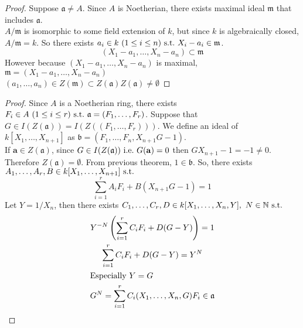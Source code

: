 \documentclass[leqno]{ltjsarticle}
\begin{document}
\begin{proof}
	Suppose $\mathfrak a\neq A$. Since $A$ is Noetherian, there exists maximal ideal $\mathfrak m$ that includes $\mathfrak a$.\\
	$A/\mathfrak m$ is isomorphic to some field extension of $k$, but since $k$ is algebraically closed, $A/\mathfrak m = k$. So there exists $a_i\in k\  (1\le i \le n) \ \mathrm{s.t.}\  X_i - a_i \in \mathfrak m$.\\
	\[(X_1-a_1,\ldots,X_n-a_n)\subset\mathfrak m\]
However because $(X_1-a_1,\ldots,X_n-a_n)$ is maximal, $\mathfrak m = (X_1-a_1,\ldots,X_n-a_n)$\\
$(a_1,\ldots ,a_n)\in Z(\mathfrak m)\subset Z(\mathfrak a)$\therefore $Z(\mathfrak a)\neq \emptyset$
\end{proof}
\begin{proof}
Since $A$ is a Noetherian ring, there exists $F_i\in A\ (1\le i\le r)\st \mathfrak a = (F_1,\ldots, F_r)$. Suppose that $G\in I(Z(\mathfrak a)) = I(Z((F_1,\ldots, F_r)))$. We define an ideal of $k[X_1,\ldots,X_{n+1}]$ as $\mathfrak b = (F_1,\ldots, F_n,X_{n+1}G-1)$.\\
If $\mathbf a\in Z(\mathfrak a)$, since $G \in I(Z(\mathfrak a))\ \mathrm{i.e.}\  G(\mathbf a)=0$ then $GX_{n+1} - 1 = -1\neq 0$. Therefore $Z(\mathfrak a) = \emptyset$. From previous theorem, $1\in \mathfrak b$. So, there exists $A_1,\ldots, A_r,B\in k[X_1,\ldots,X_{n+1}]\ \mathrm{s.t.}\ $
\[\sum_{i=1}^{r}A_iF_i + B(X_{n+1}G - 1) = 1\]
Let $Y = 1/X_{n}$, then there exists $C_1,\ldots, C_r, D\in k[X_1,\ldots, X_n,Y],\ N\in\mathbb N\ \mathrm{s.t.}\ $
\begin{gather*}
	Y^{-N}\left(\sum_{i=1}^{r}C_iF_i + D(G-Y)\right) = 1\\
	\sum_{i=1}^{r}C_iF_i + D(G-Y) = Y^N\\
	\intertext{Especially $Y = G$}
	G^N = \sum_{i=1}^{r}C_i(X_1,\ldots,X_n,G)F_i \in \mathfrak a
\end{gather*}
\end{proof}
\mylem{
	\[Z(\mathfrak a) = Z(\sqrt{\mathfrak a})\]
}
\end{document}
